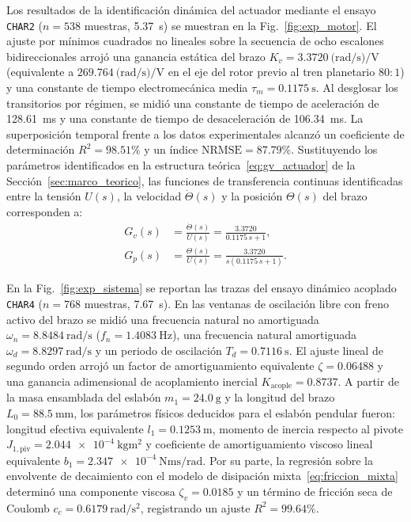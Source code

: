 Los resultados de la identificación dinámica del actuador mediante el ensayo \texttt{CHAR2} ($n=538$ muestras, \qty{5.37}{\second}) se muestran en la Fig.~\ref{fig:exp_motor}. El ajuste por mínimos cuadrados no lineales sobre la secuencia de ocho escalones bidireccionales arrojó una ganancia estática del brazo $K_v=\qty{3.3720}{(\radian\per\second)\per\volt}$ (equivalente a $\qty{269.764}{(\radian\per\second)\per\volt}$ en el eje del rotor previo al tren planetario $80:1$) y una constante de tiempo electromecánica media $\tau_m=\qty{0.1175}{\second}$. Al desglosar los transitorios por régimen, se midió una constante de tiempo de aceleración de \qty{128.61}{\milli\second} y una constante de tiempo de desaceleración de \qty{106.34}{\milli\second}. La superposición temporal frente a los datos experimentales alcanzó un coeficiente de determinación $R^2=98.51\%$ y un índice $\mathrm{NRMSE}=87.79\%$. Sustituyendo los parámetros identificados en la estructura teórica~\eqref{eq:gv_actuador} de la Sección~\ref{sec:marco_teorico}, las funciones de transferencia continuas identificadas entre la tensión $U(s)$, la velocidad $\dot{\Theta}(s)$ y la posición $\Theta(s)$ del brazo corresponden a:
\begin{equation}
    \begin{aligned}
        G_v(s) &= \frac{\dot{\Theta}(s)}{U(s)} = \frac{3.3720}{0.1175\,s + 1}, \\[3pt]
        G_p(s) &= \frac{\Theta(s)}{U(s)} = \frac{3.3720}{s(0.1175\,s + 1)}.
    \end{aligned}
    \label{eq:gv_identificada}
\end{equation}

En la Fig.~\ref{fig:exp_sistema} se reportan las trazas del ensayo dinámico acoplado \texttt{CHAR4} ($n=768$ muestras, \qty{7.67}{\second}). En las ventanas de oscilación libre con freno activo del brazo se midió una frecuencia natural no amortiguada $\omega_n=\qty{8.8484}{\radian\per\second}$ ($f_n=\qty{1.4083}{\hertz}$), una frecuencia natural amortiguada $\omega_d=\qty{8.8297}{\radian\per\second}$ y un periodo de oscilación $T_d=\qty{0.7116}{\second}$. El ajuste lineal de segundo orden arrojó un factor de amortiguamiento equivalente $\zeta=0.06488$ y una ganancia adimensional de acoplamiento inercial $K_{\text{acople}}=0.8737$. A partir de la masa ensamblada del eslabón $m_1=\qty{24.0}{\gram}$ y la longitud del brazo $L_0=\qty{88.5}{\milli\meter}$, los parámetros físicos deducidos para el eslabón pendular fueron: longitud efectiva equivalente $l_1=\qty{0.1253}{\meter}$, momento de inercia respecto al pivote $J_{1,\text{piv}}=\qty{2.044e-4}{\kilo\gram\square\meter}$ y coeficiente de amortiguamiento viscoso lineal equivalente $b_1=\qty{2.347e-4}{\newton\meter\second\per\radian}$. Por su parte, la regresión sobre la envolvente de decaimiento con el modelo de disipación mixta~\eqref{eq:friccion_mixta} determinó una componente viscosa $\zeta_v=0.0185$ y un término de fricción seca de Coulomb $c_c=\qty{0.6179}{\radian\per\second\squared}$, registrando un ajuste $R^2=99.64\%$.

